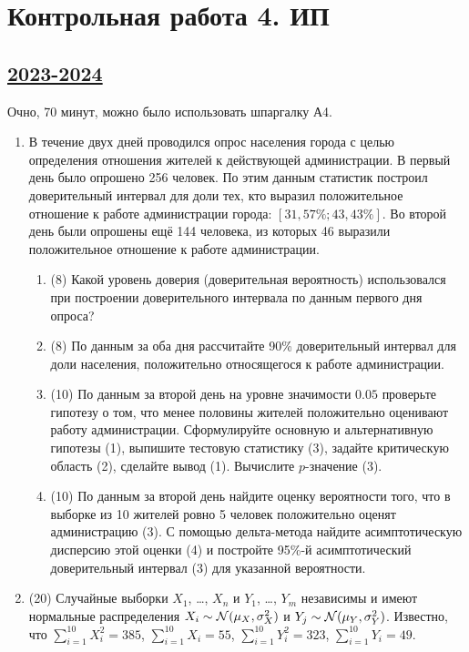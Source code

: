 \newpage
\thispagestyle{empty}
\section{Контрольная работа 4. ИП}

\subsection[2023-2024]{\hyperref[sec:sol_kr_04_ip_2023_2024]{2023-2024}}
\label{sec:kr_04_ip_2023_2024}

Очно, 70 минут, можно было использовать шпаргалку А4.

\begin{enumerate}
\item  В течение двух дней проводился опрос населения города с целью определения отношения жителей к действующей администрации. 
В первый день было опрошено 256 человек. 
По этим данным статистик построил доверительный интервал для доли тех, 
кто выразил положительное отношение к работе администрации города: $[31,57\%; 43,43\%]$.
Во второй день были опрошены ещё 144 человека, из которых 46 выразили положительное
отношение к работе администрации.
\begin{enumerate}
\item  (8) Какой уровень доверия (доверительная вероятность) использовался при
построении доверительного интервала по данным первого дня опроса?
\item  (8) По данным за оба дня рассчитайте 90\% доверительный интервал для
доли населения, положительно относящегося к работе администрации.
\item  (10) По данным за второй день на уровне значимости $0.05$ проверьте
гипотезу о том, что менее половины жителей положительно оценивают
работу администрации. 
Сформулируйте основную и альтернативную гипотезы (1), выпишите тестовую статистику (3), 
задайте критическую область (2), сделайте вывод (1). 
Вычислите $p$-значение (3).
\item (10) По данным за второй день найдите оценку
вероятности того, что в выборке из 10 жителей ровно 5 человек положительно оценят администрацию (3).
С помощью дельта-метода найдите асимптотическую дисперсию этой оценки (4) и постройте 95\%-й асимптотический доверительный интервал (3) для указанной вероятности.
\end{enumerate}

\item  (20) Случайные выборки $X_1$, \ldots, $X_n$ и $Y_1$, \ldots, $Y_m$ независимы и имеют нормальные распределения  $X_i \sim \mathcal{N}(\mu_X, \sigma_X^2)$ и $Y_j \sim \mathcal{N}(\mu_Y, \sigma_Y^2)$.
Известно, что $\sum_{i=1}^{10} X_i^2=385$, $\sum_{i=1}^{10} X_i=55$, $\sum_{i=1}^{10} Y_i^2=323$, $\sum_{i=1}^{10} Y_i=49$.


\end{enumerate}
